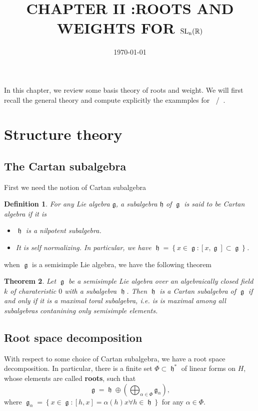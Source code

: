 \documentclass[12pt]{article} %
\title{CHAPTER II :ROOTS AND WEIGHTS FOR $\SLn$} %
\date{\today} %
\newtheorem{definition}{Definition}[section]
\newtheorem{theorem}[definition]{Theorem}
\DeclareMathOperator{\SLn}{\text{SL}_n(\mathbb{R})}
\DeclareMathOperator{\GLn}{\text{GL}_n(\mathbb{R})}
\DeclareMathOperator{\fg}{\mathfrak{g}}
\DeclareMathOperator{\fh}{\mathfrak{h}}
\begin{document}
\maketitle
In this chapter, we review some basis theory of roots and weight. We will first recall the 
general theory and compute explicitly the exammples for $\SLn$/$\GLn$.
\section{Structure theory}
\subsection{The Cartan subalgebra}
First we need the notion of Cartan subalgebra
\begin{definition}
    For any Lie algebra $\mathfrak{g}$, a subalgebra $\mathfrak{h}$ of $\fg$ is said to be \textit{Cartan algebra} if it is 
    \begin{itemize}
        \item $\fh$ is a nilpotent subalgebra.
        \item It is self normalizing. In particular, we have $\fh = \left\lbrace x \in \fg : [x,\fg] \subset \fg\right\rbrace$.
    \end{itemize}
\end{definition}
when $\fg$ is a semisimple Lie algebra, we have the following theorem
\begin{theorem}
    Let $\fg$ be a semisimple Lie algebra over an algebraically closed field $k$ of charateristic $0$ with a subalgebra $\fh$.
    Then $\fh$ is a Cartan subalgebra of $\fg$ if and only if it is a maximal toral subalgebra, i.e. is is maximal among all subalgebras
    contanining only semisimple elements. 
\end{theorem}
\subsection{Root space decomposition}
With respect to some choice of Cartan subalgebra, we have a root space decomposition. In particular, there is a finite set 
$\Phi \subset \fh^{*}$ of linear forms on $H$, whose elements are called \textbf{roots}, such that 
\[\fg = \fh \oplus \left(\bigoplus_{\alpha \in \Phi} \mathfrak{g}_\alpha\right),\]
where $\fg_\alpha = \left\lbrace x \in \fg: [h,x] = \alpha(h)x \forall h \in \fh\right\rbrace$ for any $\alpha \in \Phi$. 
\end{document}
